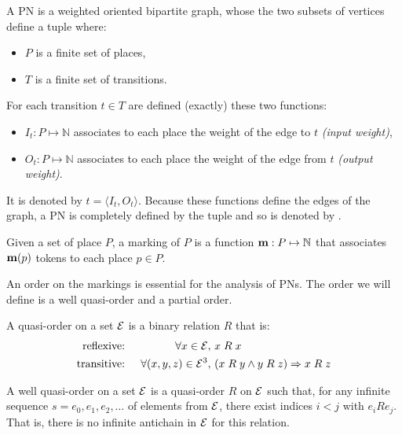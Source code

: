 \begin{defi}[\acl{PN}]
  A \acf{PN} \N is a weighted oriented bipartite graph, whose the two subsets of vertices define a tuple \PT where:
  \begin{itemize}
    \item $P$ is a finite set of places,
    \item $T$ is a finite set of transitions.
  \end{itemize}
  For each transition $t \in T$ are defined (exactly) these two functions:
  \begin{itemize}
    \item $I_t : P \mapsto \mathbb{N}$ associates to each place the weight of the edge to $t$ \emph{(input weight)},
    \item $O_t : P \mapsto \mathbb{N}$ associates to each place the weight of the edge from $t$ \emph{(output weight)}.
  \end{itemize}
  It is denoted by $t = \langle I_t, O_t \rangle$.
  Because these functions define the edges of the graph, a \ac{PN} is completely defined by the tuple \PT and so is denoted by \NPT.
\end{defi}

\begin{defi}[marking]
  Given a set of place $P$, a marking of $P$ is a function $\mathbf{m} : P \mapsto \mathbb{N}$ that associates $\mathbf{m}(p)$ tokens to each place $p \in P$.
\end{defi}

An order on the markings is essential for the analysis of \acp{PN}. The order we will define is a well quasi-order and a partial order.

\begin{defi}
  A quasi-order on a set $\mathcal{E}$ is a binary relation $R$ that is:
  \begin{align*}
    \text{reflexive: } &&\forall x \in \mathcal{E},\ & x \mathrel{R} x \\
    \text{transitive: } &&\forall (x, y, z) \in \mathcal{E}^3,\ & (x \mathrel{R} y\land y \mathrel{R} z)\Rightarrow x \mathrel{R} z
  \end{align*}
\end{defi}

\begin{defi}
  A well quasi-order on a set $\mathcal{E}$ is a quasi-order $R$ on $\mathcal{E}$ such that, for any infinite sequence $s = e_0, e_1, e_2, \dots$ of elements from $\mathcal{E}$, there exist indices $i < j$ with $e_i R e_j$. That is, there is no infinite antichain in $\mathcal{E}$ for this relation.
\end{defi}

